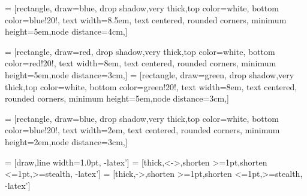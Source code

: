     
 = [rectangle, draw=blue, drop shadow,very thick,top color=white,              %
    bottom color=blue!20!,%
    text width=8.5em, text centered, rounded corners, minimum height=5em,node distance=4cm,]
 
  =  [rectangle, draw=red, drop shadow,very thick,top color=white,              %
    bottom color=red!20!,%
    text width=8em, text centered, rounded corners, minimum height=5em,node distance=3cm,]
 = [rectangle, draw=green, drop shadow,very thick,top color=white,              %
    bottom color=green!20!,%
    text width=8em, text centered, rounded corners, minimum height=5em,node distance=3cm,]

 = [rectangle, draw=blue, drop shadow,very thick,top color=white,              %
    bottom color=blue!20!,%
    text width=2em, text centered, rounded corners, minimum height=2em,node distance=3cm,]
 

 = [draw,line width=1.0pt, -latex']
 = [thick,<->,shorten >=1pt,shorten <=1pt,>=stealth, -latex']
 = [thick,->,shorten >=1pt,shorten <=1pt,>=stealth, -latex']
    
